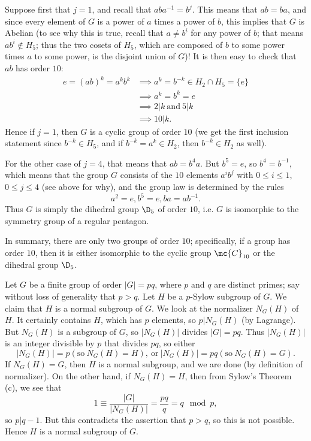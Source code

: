 \documentclass[math1530-lecture-notes]{subfiles}
\begin{document}
\begin{example}
  Suppose first that $j=1$, and recall that $aba^{-1}=b^j$. This means that $ab=ba$, and since every
  element of $G$ is a power of $a$ times a power of $b$, this implies that $G$ is Abelian (to see
  why this is true, recall that $a\neq b^i$ for any power of $b$; that means $ab^i\not\in H_5$; thus
  the two cosets of $H_5$, which are composed of $b$ to some power times $a$ to some power, is the
  disjoint union of $G$)! It is then easy to check that $ab$ has order $10$:
  \begin{align*}
    e=(ab)^k=a^kb^k&\implies a^k=b^{-k}\in H_2\cap H_5=\{ e \}\\
                   &\implies a^k=b^k=e\\
                   &\implies 2|k~\text{and}~5|k\\
                   &\implies 10|k
  .\end{align*} Hence if $j=1$, then $G$ is a cyclic group of order $10$
  (we get the first inclusion statement since $b^{-k}\in H_5$, and if $b^{-k}=a^k\in H_2$, then
  $b^{-k}\in H_2$ as well).

  For the other case of $j=4$, that means that $ab=b^4a$. But $b^{5}=e$, so $b^4=b^{-1}$, which
  means that the group $G$ consists of the $10$ elements $a^ib^j$ with $0\le i\le 1$, $0\le j\le 4$
  (see above for why), and the group law is determined by the rules \[
    a^2=e,b^5=e,ba=ab^{-1}
  .\] Thus $G$ is simply the dihedral group $\D_5$ of order $10$, i.e. $G$ is isomorphic to the
  symmetry group of a regular pentagon. 

  In summary, there are only two groups of order $10$; specifically, if a group has order $10$, then
  it is either isomorphic to the cyclic group $\mc{C}_{10}$ or the dihedral group $\D_5$.
\end{example}

\begin{example}
  Let $G$ be a finite group of order $\left| G \right| =pq$, where $p$ and $q$ are distinct primes;
  say without loss of generality that $p>q$. Let $H$ be a $p$-Sylow subgroup of $G$. We claim that
  $H$ is a normal subgroup of $G$. We look at the normalizer $N_G(H)$ of $H$. It certainly contains
  $H$, which has $p$ elements, so $p|N_G(H)$ (by Lagrange). But $N_G(H)$ is a subgroup of $G$, so
  $\left| N_G(H) \right|$ divides $\left| G \right| =pq$. Thus $\left| N_G(H) \right| $ is an
  integer divisible by $p$ that divides $pq$, so either \[
    \left| N_G(H) \right| =p (\text{so}~N_G(H)=H),~\text{or}~\left| N_G(H) \right| =pq
    (\text{so}~N_G(H)=G)
  .\] If $N_G(H)=G$, then $H$ is a normal subgroup, and we are done (by definition of normalizer).
  On the other hand, if $N_G(H)=H$, then from Sylow's Theorem (c), we see that \[
    1\equiv\frac{\left| G \right| }{\left| N_G(H) \right| }=\frac{pq}{q}=q\mod{p}
  ,\] so $p|q-1$. But this contradicts the assertion that $p>q$, so this is not possible. Hence $H$
  is a normal subgroup of $G$.
\end{example}
\end{document}
